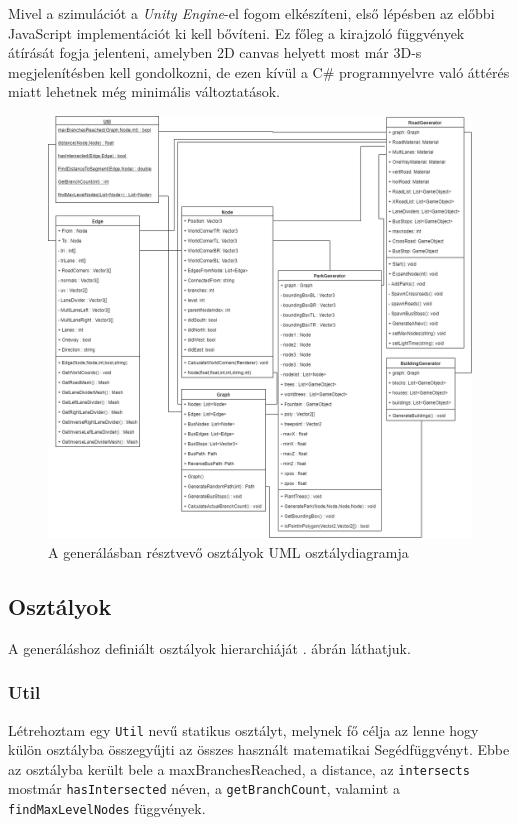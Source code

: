 
Mivel a szimulációt a \textit{Unity Engine}-el fogom elkészíteni, első lépésben az előbbi JavaScript implementációt ki kell bővíteni. Ez főleg a kirajzoló függvények átírását fogja jelenteni, amelyben 2D canvas helyett most már 3D-s megjelenítésben kell gondolkozni, de ezen kívül a C\# programnyelvre való áttérés miatt lehetnek még minimális változtatások.

\begin{figure}[H]
\includegraphics[scale=0.4,keepaspectratio]{generateuml.png}
\caption{A generálásban résztvevő osztályok UML osztálydiagramja}
\label{fig:genuml}
\end{figure}

\subsection{Osztályok}

A generáláshoz definiált osztályok hierarchiáját . ábrán láthatjuk.

\subsubsection{Util}

Létrehoztam egy \texttt{Util} nevű statikus osztályt, melynek fő célja az lenne hogy külön osztályba összegyűjti az összes használt matematikai Segédfüggvényt. Ebbe az osztályba került bele a maxBranchesReached, a distance, az \texttt{intersects} mostmár \texttt{hasIntersected} néven, a \texttt{getBranchCount}, valamint a \texttt{findMaxLevelNodes} függvények. 

